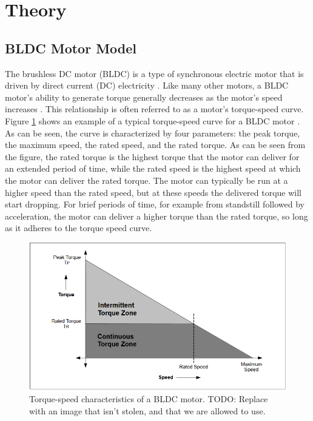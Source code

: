 \section{Theory}

\subsection{BLDC Motor Model}
    \label{sec:bldc_theory}

    The brushless DC motor (BLDC) is a type of synchronous electric motor that is driven by direct current (DC) electricity \cite{PMSM_BOOK}. Like many other motors, a BLDC motor's ability to generate torque generally decreases as the motor's speed increases \cite{Microchip_BLDC}. This relationship is often referred to as a motor's torque-speed curve. Figure \ref{fig:bldc_torque_speed} shows an example of a typical torque-speed curve for a BLDC motor \cite{Microchip_BLDC}. As can be seen, the curve is characterized by four parameters: the peak torque, the maximum speed, the rated speed, and the rated torque. As can be seen from the figure, the rated torque is the highest torque that the motor can deliver for an extended period of time, while the rated speed is the highest speed at which the motor can deliver the rated torque. The motor can typically be run at a higher speed than the rated speed, but at these speeds the delivered torque will start dropping. For brief periods of time, for example from standstill followed by acceleration, the motor can deliver a higher torque than the rated torque, so long as it adheres to the torque speed curve. 

    \begin{figure}[H]
        \centering
        \includegraphics[width=\textwidth]{Images/stolen_BLDC_torque_speed.png}
        \caption{Torque-speed characteristics of a BLDC motor. TODO: Replace with an image that isn't stolen, and that we are allowed to use. }
        \label{fig:bldc_torque_speed}
    \end{figure}

